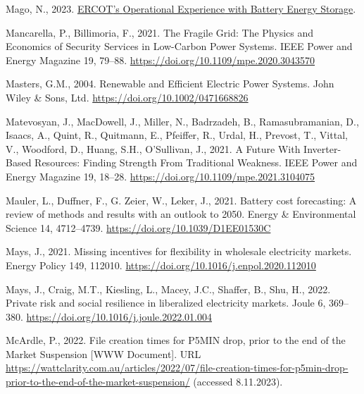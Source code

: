 \documentclass[12pt,a4paper,]{report}
\newlength{\cslhangindent}
\newenvironment{CSLReferences}[2] %
 {%
  \setlength{\parindent}{0pt}
  \ifodd #1 \everypar{\setlength{\hangindent}{\cslhangindent}}\ignorespaces\fi
  \ifnum #2 > 0
  \setlength{\parskip}{#2\baselineskip}
  \fi
 }%
 {}
\begin{document}
\begin{CSLReferences}{1}{0}
\leavevmode{}%
Mago, N., 2023.
\href{https://www.esig.energy/event/g-pst-esig-webinar-series-operational-experience-with-battery-energy-storage-in-ercot/}{{ERCOT}'s
{Operational Experience} with {Battery Energy Storage}}.

\leavevmode{}%
Mancarella, P., Billimoria, F., 2021. The {Fragile Grid}: {The Physics}
and {Economics} of {Security Services} in {Low-Carbon Power Systems}.
IEEE Power and Energy Magazine 19, 79--88.
\url{https://doi.org/10.1109/mpe.2020.3043570}

\leavevmode{}%
Masters, G.M., 2004. Renewable and {Efficient Electric Power Systems}.
{John Wiley \& Sons, Ltd}. \url{https://doi.org/10.1002/0471668826}

\leavevmode{}%
Matevosyan, J., MacDowell, J., Miller, N., Badrzadeh, B.,
Ramasubramanian, D., Isaacs, A., Quint, R., Quitmann, E., Pfeiffer, R.,
Urdal, H., Prevost, T., Vittal, V., Woodford, D., Huang, S.H.,
O'Sullivan, J., 2021. A {Future With Inverter-Based Resources}: {Finding
Strength From Traditional Weakness}. IEEE Power and Energy Magazine 19,
18--28. \url{https://doi.org/10.1109/mpe.2021.3104075}

\leavevmode{}%
Mauler, L., Duffner, F., G. Zeier, W., Leker, J., 2021. Battery cost
forecasting: A review of methods and results with an outlook to 2050.
Energy \& Environmental Science 14, 4712--4739.
\url{https://doi.org/10.1039/D1EE01530C}

\leavevmode{}%
Mays, J., 2021. Missing incentives for flexibility in wholesale
electricity markets. Energy Policy 149, 112010.
\url{https://doi.org/10.1016/j.enpol.2020.112010}

\leavevmode{}%
Mays, J., Craig, M.T., Kiesling, L., Macey, J.C., Shaffer, B., Shu, H.,
2022. Private risk and social resilience in liberalized electricity
markets. Joule 6, 369--380.
\url{https://doi.org/10.1016/j.joule.2022.01.004}

\leavevmode{}%
McArdle, P., 2022. File creation times for {P5MIN} drop, prior to the
end of the {Market Suspension} {[}WWW Document{]}. URL
\url{https://wattclarity.com.au/articles/2022/07/file-creation-times-for-p5min-drop-prior-to-the-end-of-the-market-suspension/}
(accessed 8.11.2023).


\end{CSLReferences}
\end{document}
